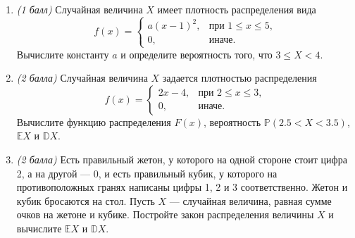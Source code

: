 \documentclass{article}
\begin{document}
\begin{enumerate}
\item \textit{(1 балл)} Случайная величина $X$ имеет плотность распределения вида
$$f(x)=
\begin{cases}
   a(x-1)^2, &\text{при } 1\leq x\leq5,\\
   0, &\text{иначе}.
 \end{cases}$$
Вычислите константу $a$ и определите вероятность того, что $3\leq X<4$.

\item \textit{(2 балла)} Случайная величина $X$ задается плотностью распределения
$$f(x)=
\begin{cases}
   2x-4, &\text{при } 2\leq x\leq3,\\
   0, &\text{иначе}.
 \end{cases}$$
Вычислите функцию распределения $F(x)$, вероятность $\mathbb{P}(2.5<X<3.5)$, $\mathbb{E}X$ и $\mathbb{D}X$.

\item \textit{(2 балла)} Есть правильный жетон, у которого на одной стороне стоит цифра 2, а на другой --- 0, и есть правильный кубик, у которого на противоположных гранях написаны цифры 1, 2 и 3 соответственно. Жетон и кубик бросаются на стол. Пусть $X$ --- случайная величина, равная сумме очков на жетоне и кубике. Постройте закон распределения величины $X$ и вычислите $\mathbb{E}X$ и $\mathbb{D}X$.



\end{enumerate}
\end{document}

